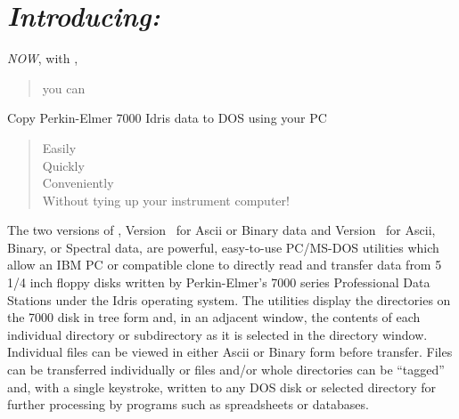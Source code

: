 \pagestyle{empty} 

\thicklines
\setlength{\unitlength}{1.2pt}

%
%
\oddsidemargin 0in \evensidemargin 0in \topmargin 0.75in
\columnsep 10pt \columnseprule 0pt 
\marginparwidth 90pt \marginparsep 11pt \marginparpush 5pt 
\headheight 0pt \headsep 0pt 
\footheight 0pt \footskip 0pt 
\textheight 8in \textwidth 6.55in

 



\section*{{\sl Introducing: \RD}} 
{\sl NOW}, with \RD,
\begin{quote}
	you can
\end{quote}
Copy Perkin-Elmer 7000 Idris data to DOS using your PC
\begin{quote}
	Easily\\
	Quickly\\
	Conveniently\\
	Without tying up your instrument computer!
\end{quote}
 
The two versions of \RD, Version \AB\ for Ascii or Binary data and
Version \SP\ for Ascii, Binary, or Spectral data, are powerful, easy-to-use
PC/MS-DOS utilities which allow an IBM PC or compatible clone to
directly read and transfer data from 5 1/4 inch floppy disks written
by Perkin-Elmer's 7000 series Professional Data Stations under the
Idris operating system.  The utilities display the directories on the
7000 disk in tree form and, in an adjacent window, the contents of
each individual directory or subdirectory as it is selected in the
directory window.  Individual files can be viewed in either Ascii or
Binary form before transfer.  Files can be transferred individually or
files and/or whole directories can be ``tagged'' and, with a single
keystroke, written to any DOS disk or selected directory for further
processing by programs such as spreadsheets or databases.
 
